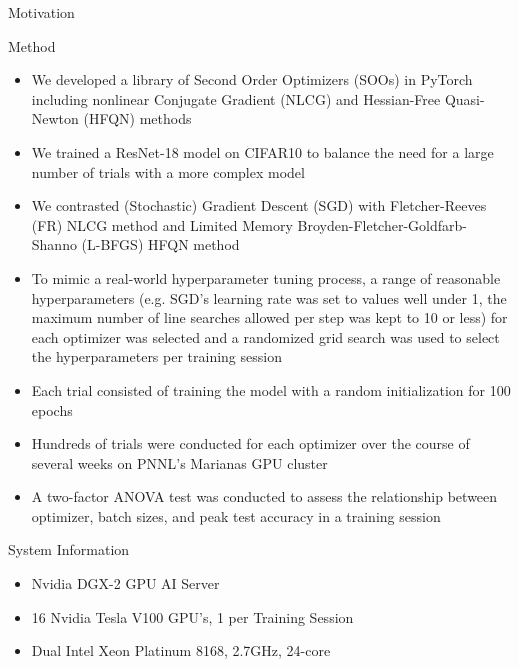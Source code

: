 \documentclass[final]{beamer}
\newlength{\colwidth}
\begin{document}
\begin{frame}[t]
\begin{columns}[t]
\begin{column}{\colwidth}
\begin{alertblock}{Motivation}
      \end{alertblock}

      \begin{block}{Method}
        \begin{itemize}
          \item We developed a library of Second Order Optimizers (SOOs) in PyTorch including nonlinear
                Conjugate Gradient (NLCG) and Hessian-Free Quasi-Newton (HFQN) methods
          \item We trained a ResNet-18 model on CIFAR10 to balance the need for a large
                number of trials with a more complex model
          \item We contrasted (Stochastic) Gradient Descent (SGD) with Fletcher-Reeves (FR) NLCG
                method and Limited Memory Broyden-Fletcher-Goldfarb-Shanno (L-BFGS) HFQN method
          \item To mimic a real-world hyperparameter tuning process, a range of reasonable
                hyperparameters (e.g. SGD's learning rate was set to values well under 1, the maximum
                number of line searches allowed per step was kept to 10 or less) for each optimizer was
                selected and a randomized grid search was used to select the hyperparameters per training
                session
          \item Each trial consisted of training the model with a random initialization for 100 epochs
          \item Hundreds of trials were conducted for each optimizer over the course of several
                weeks on PNNL's Marianas GPU cluster
          \item A two-factor ANOVA test was conducted to assess the relationship between optimizer,
                batch sizes, and peak test accuracy in a training session
        \end{itemize}

      \end{block}
      \begin{block}{System Information}
        \begin{itemize}
          \item Nvidia DGX-2 GPU AI Server
          \item 16 Nvidia Tesla V100 GPU's, 1 per Training Session
          \item Dual Intel Xeon Platinum 8168, 2.7GHz, 24-core
        \end{itemize}
      \end{block}


\end{column}
\end{columns}
\end{frame}
\end{document}
